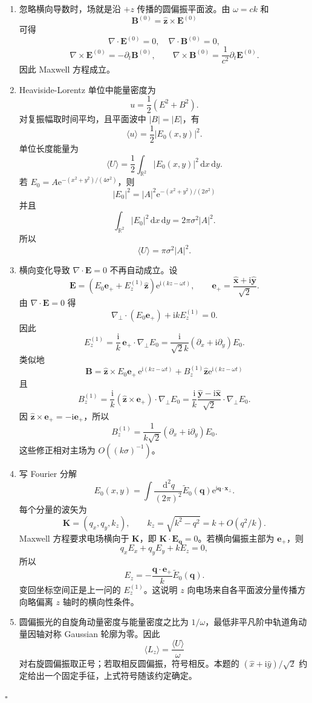 \documentclass[UTF8,12pt]{ctexart}
\newcommand{\R}{\mathbb R}
\newcommand{\dd}{\,\mathrm d}
\newcommand{\ii}{\mathrm i}
\newcommand{\ee}{\mathrm e}
\newenvironment{solution}{%
  \par\medskip
  \noindent{\bfseries 解答}\quad\ignorespaces
}{\hfill$\square$\par\medskip}
\begin{document}
\begin{solution}
\begin{enumerate}[label=(\arabic*)]
\item 忽略横向导数时，场就是沿 \(+z\) 传播的圆偏振平面波。由 \(\omega=ck\) 和
\[
\bm B^{(0)}=\hat{\bm z}\times\bm E^{(0)}
\]
可得
\[
\nabla\cdot\bm E^{(0)}=0,\quad \nabla\cdot\bm B^{(0)}=0,
\]
\[
\nabla\times\bm E^{(0)}=-\partial_t\bm B^{(0)},\qquad
\nabla\times\bm B^{(0)}=\frac1{c^2}\partial_t\bm E^{(0)}.
\]
因此 Maxwell 方程成立。

\item Heaviside-Lorentz 单位中能量密度为
\[
u=\frac12(E^2+B^2).
\]
对复振幅取时间平均，且平面波中 \(|B|=|E|\)，有
\[
\langle u\rangle=\frac12|E_0(x,y)|^2.
\]
单位长度能量为
\[
\langle U\rangle
=\frac12\int_{\R^2}|E_0(x,y)|^2\dd x\dd y.
\]
若 \(E_0=A\ee^{-(x^2+y^2)/(4\sigma^2)}\)，则
\[
|E_0|^2=|A|^2\ee^{-(x^2+y^2)/(2\sigma^2)}
\]
并且
\[
\int_{\R^2}|E_0|^2\dd x\dd y=2\pi\sigma^2|A|^2.
\]
所以
\[
\langle U\rangle=\pi\sigma^2|A|^2.
\]

\item 横向变化导致 \(\nabla\cdot\bm E=0\) 不再自动成立。设
\[
\bm E=\left(E_0\bm e_++E_z^{(1)}\hat{\bm z}\right)\ee^{\ii(kz-\omega t)},
\qquad
\bm e_+=\frac{\hat{\bm x}+\ii\hat{\bm y}}{\sqrt2}.
\]
由 \(\nabla\cdot\bm E=0\) 得
\[
\nabla_\perp\cdot(E_0\bm e_+)+\ii kE_z^{(1)}=0.
\]
因此
\[
E_z^{(1)}
=\frac{\ii}{k}\,\bm e_+\cdot\nabla_\perp E_0
=\frac{\ii}{\sqrt2 k}(\partial_x+\ii\partial_y)E_0.
\]
类似地
\[
\bm B=\hat{\bm z}\times E_0\bm e_+\,\ee^{\ii(kz-\omega t)}
+B_z^{(1)}\hat{\bm z}\ee^{\ii(kz-\omega t)}
\]
且
\[
B_z^{(1)}
=\frac{\ii}{k}(\hat{\bm z}\times\bm e_+)\cdot\nabla_\perp E_0
=\frac{\ii}{k}\frac{\hat{\bm y}-\ii\hat{\bm x}}{\sqrt2}\cdot\nabla_\perp E_0.
\]
因 \(\hat{\bm z}\times\bm e_+=-\ii\bm e_+\)，所以
\[
B_z^{(1)}=\frac1{k\sqrt2}(\partial_x+\ii\partial_y)E_0.
\]
这些修正相对主场为 \(O((k\sigma)^{-1})\)。

\item 写 Fourier 分解
\[
E_0(x,y)=\int\frac{\dd^2q}{(2\pi)^2}\tilde E_0(\bm q)\ee^{\ii\bm q\cdot\bm x_\perp}.
\]
每个分量的波矢为
\[
\bm K=(q_x,q_y,k_z),\qquad k_z=\sqrt{k^2-q^2}=k+O(q^2/k).
\]
Maxwell 方程要求电场横向于 \(\bm K\)，即 \(\bm K\cdot\bm E_{\bm q}=0\)。若横向偏振主部为 \(\bm e_+\)，则
\[
q_xE_x+q_yE_y+kE_z=0,
\]
所以
\[
E_z=-\frac{\bm q\cdot\bm e_+}{k}\tilde E_0(\bm q).
\]
变回坐标空间正是上一问的 \(E_z^{(1)}\)。这说明 \(z\) 向电场来自各平面波分量传播方向略偏离 \(z\) 轴时的横向性条件。

\item 圆偏振光的自旋角动量密度与能量密度之比为 \(1/\omega\)，最低非平凡阶中轨道角动量因轴对称 Gaussian 轮廓为零。因此
\[
\langle L_z\rangle
=\frac{\langle U\rangle}{\omega}
\]
对右旋圆偏振取正号；若取相反圆偏振，符号相反。本题的 \((\hat x+\ii\hat y)/\sqrt2\) 约定给出一个固定手征，上式符号随该约定确定。


\end{enumerate}
\end{solution}
\end{document}
